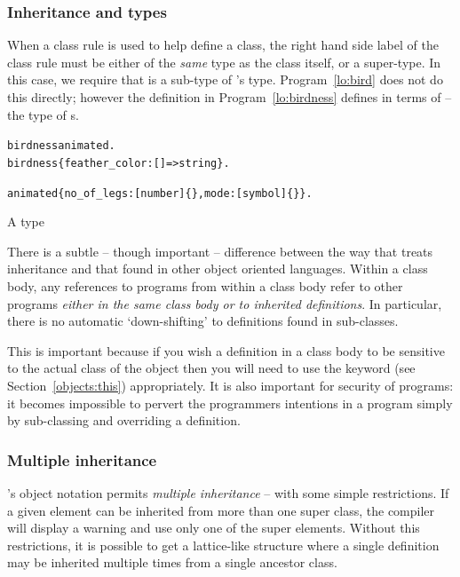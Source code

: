 \subsubsection{Inheritance and types}
When a class rule is used to help define a class, the right hand side label of the class rule must be either of the \emph{same} type as the class itself, or a super-type. In this case, we require that  is a sub-type of 's type. Program~\vref{lo:bird} does not do this directly; however the definition in Program~\vref{lo:birdness} defines  in terms of  -- the type of s.
\begin{program}
\vspace{0.5ex}
\begin{alltt}
birdness \impl animated.
birdness \impl \{ feather_color:[]=>string \}.

animated \impl \{ no_of_legs:[number]\{\},mode:[symbol]\{\} \}.
\end{alltt}
\vspace{-2ex}
\caption{A  type}
\label{lo:birdness}
\end{program}
\begin{aside}
There is a subtle -- though important -- difference between the way that \go treats inheritance and that found in other object oriented languages. Within a class body, any references to programs from within a class body refer to other programs \emph{either in the same class body or to inherited definitions}. In particular, there is no automatic `down-shifting' to definitions found in sub-classes.

This is important because if you wish a definition in a class body to be sensitive to the actual class of the object then you will need to use the  keyword (see Section~\vref{objects:this}) appropriately. It is also important for security of programs: it becomes impossible to pervert the programmers intentions in a program simply by sub-classing and overriding a definition.
\end{aside}


\subsubsection{Multiple inheritance}
\go's object notation permits \emph{multiple inheritance} -- with some simple restrictions. If a given element can be inherited from more than one super class, the compiler will display a warning and use only one of the super elements. Without this restrictions, it is possible to get a lattice-like structure where a single definition may be inherited multiple times from a single ancestor class. 

